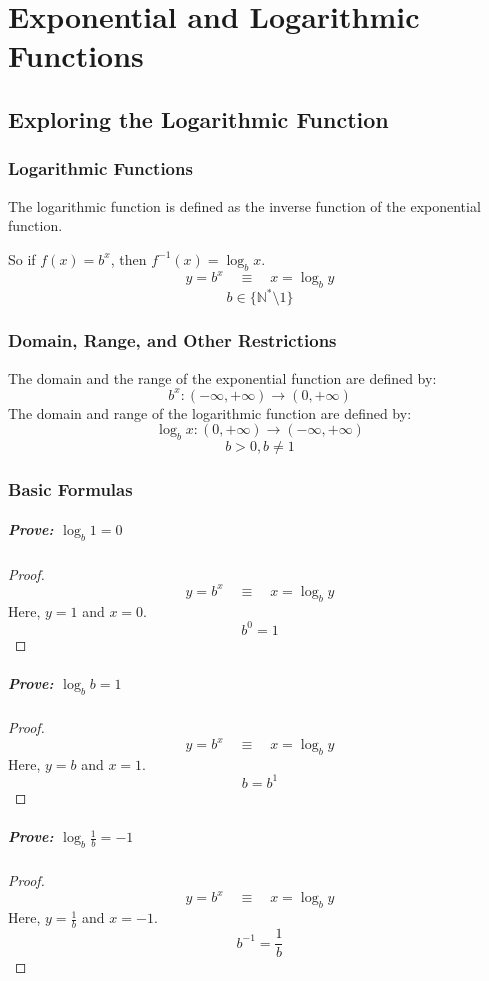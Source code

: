 \setcounter{chapter}{7}
\chapter{Exponential and Logarithmic Functions}
	\section{Exploring the Logarithmic Function}
		\subsection{Logarithmic Functions}
			The logarithmic function is defined as the inverse function of the exponential function.

			So if $f(x) = b^x$, then $f^{-1}(x)=\log_bx$.
			\[y=b^x \quad \equiv \quad x=\log_by\]
			\[b \in \{\mathbb{N^*} \setminus 1\}\]
		\subsection{Domain, Range, and Other Restrictions}
			The domain and the range of the exponential function are defined by:
			\[b^x: (-\infty, +\infty) \rightarrow (0, +\infty)\]
			The domain and range of the logarithmic function are defined by:
			\[\log_bx: (0, +\infty) \rightarrow (-\infty, +\infty)\]
			\[b > 0, b \neq 1\]
		\subsection{Basic Formulas}
			\paragraph{Prove: $\log_b1=0$}
				\begin{proof}
					\[y=b^x \quad \equiv \quad x=\log_by\]
					Here, $y=1$ and $x=0$.
					\[b^0 = 1\]
				\end{proof}
			\paragraph{Prove: $\log_bb=1$}
				\begin{proof}
					\[y=b^x \quad \equiv \quad x=\log_by\]
					Here, $y=b$ and $x=1$.
					\[b = b^1\]
				\end{proof}
			\paragraph{Prove: $\log_b\frac{1}{b}=-1$}
				\begin{proof}
					\[y=b^x \quad \equiv \quad x=\log_by\]
					Here, $y=\frac{1}{b}$ and $x=-1$.
					\[b^{-1} = \frac{1}{b}\]
				\end{proof}
